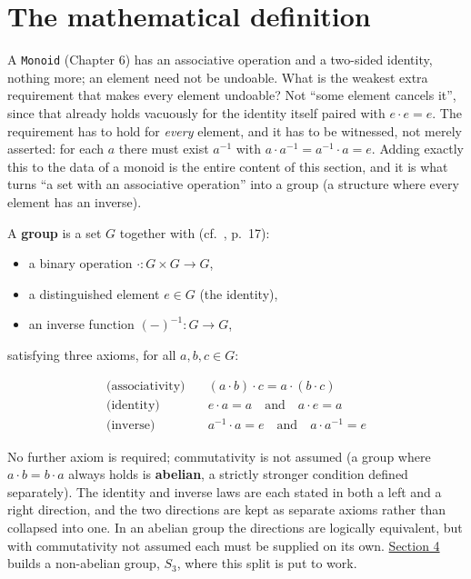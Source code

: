 \section{The mathematical definition}\label{sec:07-groups:01-definition:1}

A \texttt{Monoid} (Chapter 6) has an associative operation and a two-sided identity, nothing more; an element need not be undoable. What is the weakest extra requirement that makes every element undoable? Not ``some element cancels it'', since that already holds vacuously for the identity itself paired with \(e \cdot e = e\). The requirement has to hold for \emph{every} element, and it has to be witnessed, not merely asserted: for each \(a\) there must exist \(a^{-1}\) with \(a \cdot a^{-1} = a^{-1} \cdot a =
e\). Adding exactly this to the data of a monoid is the entire content of this section, and it is what turns ``a set with an associative operation'' into a group (a structure where every element has an inverse).

A \textbf{group} is a set \(G\) together with (cf.~\cite{DummitFoote2003}, p.~17):

\begin{itemize}
\tightlist
\item
  a binary operation \(\cdot : G \times G \to G\),
\item
  a distinguished element \(e \in G\) (the identity),
\item
  an inverse function \((-)^{-1} : G \to G\),
\end{itemize}

satisfying three axioms, for all \(a, b, c \in G\):

\[
\begin{aligned}
\text{(associativity)} &\quad (a \cdot b) \cdot c = a \cdot (b \cdot c) \\
\text{(identity)} &\quad e \cdot a = a \quad\text{and}\quad a \cdot e = a \\
\text{(inverse)} &\quad a^{-1} \cdot a = e \quad\text{and}\quad a \cdot a^{-1} = e
\end{aligned}
\]

No further axiom is required; commutativity is not assumed (a group where \(a \cdot b = b \cdot a\) always holds is \textbf{abelian}, a strictly stronger condition defined separately). The identity and inverse laws are each stated in both a left and a right direction, and the two directions are kept as separate axioms rather than collapsed into one. In an abelian group the directions are logically equivalent, but with commutativity not assumed each must be supplied on its own. \hyperref[sec:07-groups:04-permutations-example:1]{Section 4} builds a non-abelian group, \(S_3\), where this split is put to work.

